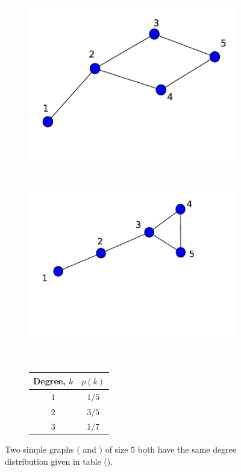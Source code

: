 \documentclass[10pt,a4paper]{article}
\theoremstyle{plain}
\theoremstyle{definition}
\begin{document}
\begin{figure}[H]
	\centering
			\begin{subfigure}[b]{0.35\textwidth}
				\includegraphics[width=\textwidth]{images/sameDegreeDistribution.pdf}
				\caption{}
				\label{samedeg1}
			\end{subfigure}~
			\begin{subfigure}[b]{0.35\textwidth}
				\includegraphics[width=\textwidth]{images/sameDegreeDistribution2.pdf}
				\caption{}
				\label{samedeg2}
			\end{subfigure}~ 
	\begin{subfigure}[b]{.35\textwidth}
		\centering
		\vspace{0pt}
		\setlength{\tabcolsep}{10pt}
		\renewcommand{\arraystretch}{2.0}
		\begin{tabular}{|c|c|}
			\hline 
			Degree, $k$ & $p(k)$ \\
			\hline
			$1$ & $1/5$ \\
			$2$ & $3/5$ \\
			$3$ & $1/7$ \\
			\hline
		\end{tabular}
        \caption{}	
        \label{tabdegdist}
	\end{subfigure}
    \caption{Two simple graphs ( and ) of size $5$ both have the same degree distribution given in table ().}
\end{figure}
\end{document}
